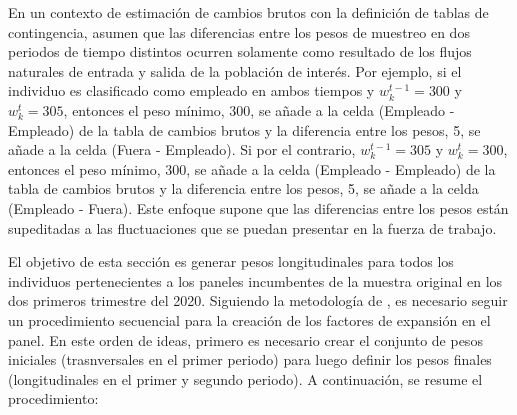 \documentclass[
  12pt,
]{book}
\begin{document}
En un contexto de estimación de cambios brutos con la definición de tablas de contingencia, \citet{Feinberg_Stasny_1983} asumen que las diferencias entre los pesos de muestreo en dos periodos de tiempo distintos ocurren solamente como resultado de los flujos naturales de entrada y
salida de la población de interés. Por ejemplo, si el individuo es
clasificado como empleado en ambos tiempos y \(w_k^{t-1}=300\) y
\(w_k^{t}=305\), entonces el peso mínimo, 300, se añade a la celda
(Empleado - Empleado) de la tabla de cambios brutos y la diferencia
entre los pesos, 5, se añade a la celda (Fuera - Empleado). Si por el
contrario, \(w_k^{t-1}=305\) y \(w_k^{t}=300\), entonces el peso mínimo,
300, se añade a la celda (Empleado - Empleado) de la tabla de cambios
brutos y la diferencia entre los pesos, 5, se añade a la celda (Empleado
- Fuera). Este enfoque supone que las diferencias entre los pesos están
supeditadas a las fluctuaciones que se puedan presentar en la fuerza de
trabajo.

El objetivo de esta sección es generar pesos longitudinales para todos los individuos pertenecientes a los paneles incumbentes de la muestra original en los dos primeros trimestre del 2020. Siguiendo la metodología de \citet{Verma_Betti_Ghellini}, es necesario seguir un procedimiento secuencial para la creación de los factores de expansión en el panel. En este orden de ideas, primero es necesario crear el conjunto de pesos iniciales (trasnversales en el primer periodo) para luego definir los pesos finales (longitudinales en el primer y segundo periodo). A continuación, se resume el procedimiento:
\end{document}
